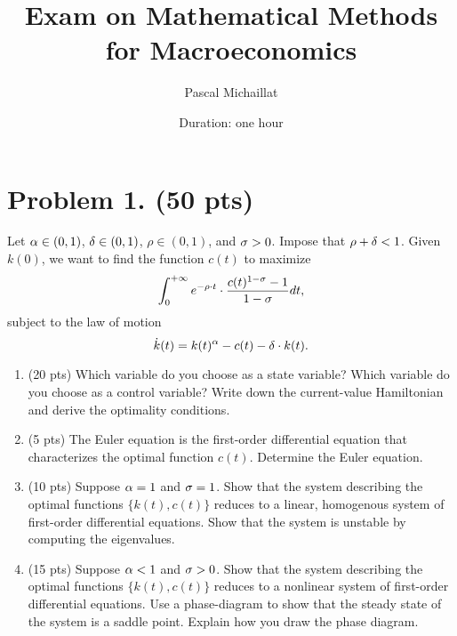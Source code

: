 \documentclass[letterpaper,12pt,leqno]{article}
\begin{document}
\title{Exam on Mathematical Methods for Macroeconomics}
\author{Pascal Michaillat}
\date{Duration: one hour}

\begin{titlepage}
\maketitle
\end{titlepage}

\section*{Problem 1. (50 pts)}

Let $\alpha \in (0,1)$, $\delta  \in (0,1)$, $\rho \in (0,1)$, and $\sigma>0$. Impose that $\rho+\delta<1$. Given $k(0)$, we want to find the function $c(t) $ to maximize 
\begin{equation*}
\int_{0}^{+\infty }e^{-\rho\cdot  t}\cdot \frac{c(t)^{1-\sigma}-1}{1-\sigma} dt,
\end{equation*}
subject to the law of motion
\begin{equation*}
\dot{k}(t) =k(t)^{\alpha}-c(t)-\delta \cdot k(t).
\end{equation*}

\begin{enumerate}

\item (20 pts) Which variable do you choose as a state variable? Which variable do you choose as a control variable? Write down the current-value Hamiltonian and derive the optimality conditions.

\item (5 pts) The Euler equation is the first-order differential equation that characterizes the optimal function $c(t)$. Determine the Euler equation.

\item (10 pts) Suppose $\alpha =1$ and $\sigma =1$. Show that the system describing the optimal functions $\{k(t),c(t)\}$ reduces to a linear, homogenous system of first-order differential equations. Show that the system is unstable by computing the eigenvalues. 

\item (15 pts) Suppose $\alpha <1$ and $\sigma >0$. Show that the system describing the optimal functions $\{k(t),c(t)\}$ reduces to a nonlinear system of first-order differential equations. Use a phase-diagram to show that the steady state of the system is a saddle point. Explain how you draw the phase diagram.

\end{enumerate}
\end{document}
